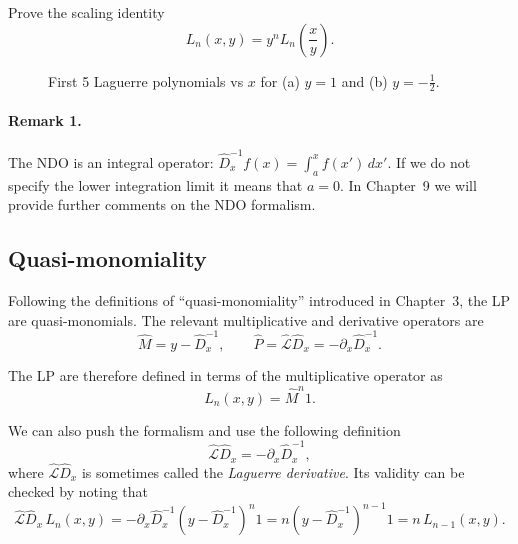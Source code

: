 \begin{exercise}
Prove the scaling identity
\begin{equation}
L_n(x,y) = y^n L_n\!\left(\frac{x}{y}\right).
\label{eq:4.1.4}
\end{equation}
\end{exercise}

\begin{figure}[h]
\centering
\setlength{\fboxsep}{6pt}
\caption{First 5 Laguerre polynomials vs $x$ for (a) $y=1$ and (b) $y=-\tfrac12$.}
\label{fig:4.1}
\end{figure}

\paragraph{Remark 1.} The NDO is an integral operator:
$\hat D_x^{-1} f(x) = \int_a^x f(x')\,dx'$.
If we do not specify the lower integration limit it means that $a=0$.
In Chapter~9 we will provide further comments on the NDO formalism.

\subsection*{Quasi-monomiality}

Following the definitions of ``quasi-monomiality'' introduced in Chapter~3,
the LP are quasi-monomials. The relevant multiplicative and derivative
operators are
\begin{equation}
\hat M = y - \hat D_x^{-1},
\qquad
\hat P = \hat{\mathcal L}\!\hat D_x = -\partial_x \hat D_x^{-1}.
\label{eq:4.1.7}
\end{equation}

The LP are therefore defined in terms of the multiplicative operator as
\begin{equation}
L_n(x,y) = \hat M^n 1.
\label{eq:4.1.8}
\end{equation}

We can also push the formalism and use the following definition
\begin{equation}
\hat{\mathcal L}\!\hat D_x
= -\partial_x \hat D_x^{-1},
\label{eq:4.1.9}
\end{equation}
where $\hat{\mathcal L}\!\hat D_x$ is sometimes called the \emph{Laguerre derivative}.
Its validity can be checked by noting that
\begin{equation}
\hat{\mathcal L}\!\hat D_x\,L_n(x,y)
= -\partial_x \hat D_x^{-1}(y-\hat D_x^{-1})^n 1
= n(y-\hat D_x^{-1})^{n-1}1
= n\,L_{n-1}(x,y).
\label{eq:4.1.10}
\end{equation}

